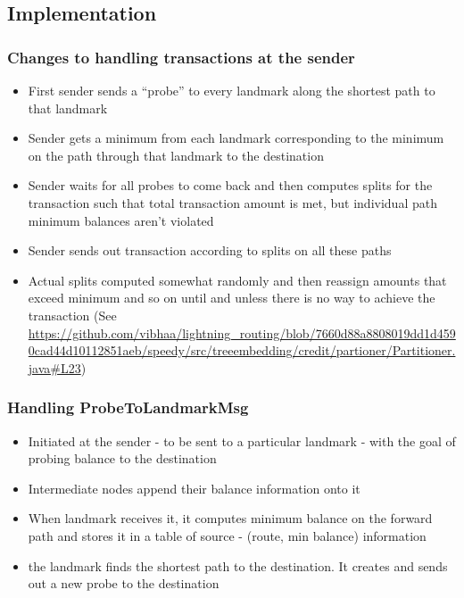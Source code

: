 \documentclass[a4paper]{article}
\begin{document}
\subsection{Implementation}
\subsubsection{Changes to handling transactions at the sender}       
\begin{itemize}
    \item First sender sends a ``probe'' to every landmark along the shortest path to that landmark 
    \item Sender gets a minimum from each landmark corresponding to the minimum on the path through that 
        landmark to the destination
    \item Sender waits for all probes to come back and then computes splits for the transaction
        such that total transaction amount is met, but individual path minimum balances aren't violated
    \item Sender sends out transaction according to splits on all these paths
    \item Actual splits computed somewhat randomly and then reassign amounts that exceed minimum and so on
        until and unless there is no way to achieve the transaction (See \url{https://github.com/vibhaa/lightning_routing/blob/7660d88a8808019dd1d4590cad44d10112851aeb/speedy/src/treeembedding/credit/partioner/Partitioner.java#L23})
\end{itemize}

\subsubsection{Handling ProbeToLandmarkMsg}
                \begin{itemize}
                    \item Initiated at the sender - 
                        to be sent to a particular landmark - with the goal of probing
                        balance to the destination
                    \item Intermediate nodes append their balance information onto it
                    \item When landmark receives it, it computes minimum balance on the forward path and
                        stores it in a table of source - (route, min balance) information
                    \item the landmark finds the 
                        shortest path to the destination. It creates and sends out a new probe to 
                        the destination
                \end{itemize}
                
\end{document}
